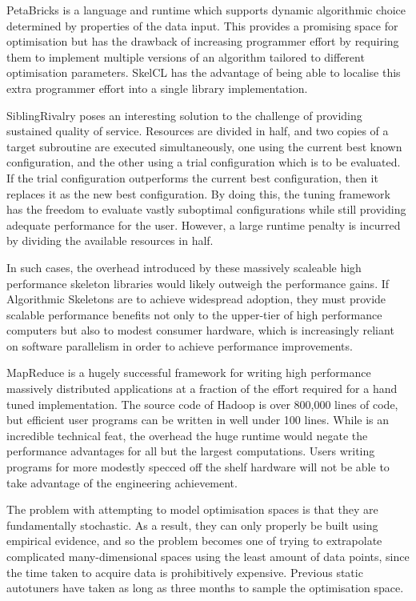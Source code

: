PetaBricks is a language and runtime which supports dynamic
algorithmic choice determined by properties of the data input. This
provides a promising space for optimisation but has the drawback of
increasing programmer effort by requiring them to implement multiple
versions of an algorithm tailored to different optimisation
parameters. SkelCL has the advantage of being able to localise this
extra programmer effort into a single library implementation.

SiblingRivalry poses an interesting solution to the challenge of
providing sustained quality of service. Resources are divided in half,
and two copies of a target subroutine are executed simultaneously, one
using the current best known configuration, and the other using a
trial configuration which is to be evaluated. If the trial
configuration outperforms the current best configuration, then it
replaces it as the new best configuration. By doing this, the tuning
framework has the freedom to evaluate vastly suboptimal configurations
while still providing adequate performance for the user. However, a
large runtime penalty is incurred by dividing the available resources
in half.

In such cases, the overhead introduced by these massively scaleable
high performance skeleton libraries would likely outweigh the
performance gains. If Algorithmic Skeletons are to achieve widespread
adoption, they must provide scalable performance benefits not only to
the upper-tier of high performance computers but also to modest
consumer hardware, which is increasingly reliant on software
parallelism in order to achieve performance improvements.

MapReduce is a hugely successful framework for writing high
performance massively distributed applications at a fraction of the
effort required for a hand tuned implementation. The source code of
Hadoop is over 800,000 lines of code, but efficient user programs can
be written in well under 100 lines. While is an incredible technical
feat, the overhead the huge runtime would negate the performance
advantages for all but the largest computations. Users writing
programs for more modestly specced off the shelf hardware will not be
able to take advantage of the engineering achievement.

The problem with attempting to model optimisation spaces is that they
are fundamentally stochastic. As a result, they can only properly be
built using empirical evidence, and so the problem becomes one of
trying to extrapolate complicated many-dimensional spaces using the
least amount of data points, since the time taken to acquire data is
prohibitively expensive. Previous static autotuners have taken as long
as three months to sample the optimisation space.

